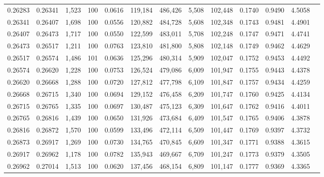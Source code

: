 \begin{tabular}{rrrrrrrrrrrrr}
0.26283 & 0.26341 & 1,523 & 100 &                                     0.0616 & 119,184 & 486,426 &   5,508 & 102,448 & 0.1740 & 0.9490 & 4.5058 \\
0.26341 & 0.26407 & 1,698 & 100 &                                     0.0556 & 120,882 & 484,728 &   5,608 & 102,348 & 0.1743 & 0.9481 & 4.4901 \\
0.26407 & 0.26473 & 1,717 & 100 &                                     0.0550 & 122,599 & 483,011 &   5,708 & 102,248 & 0.1747 & 0.9471 & 4.4741 \\
0.26473 & 0.26517 & 1,211 & 100 &                                     0.0763 & 123,810 & 481,800 &   5,808 & 102,148 & 0.1749 & 0.9462 & 4.4629 \\
0.26517 & 0.26574 & 1,486 & 101 &                                     0.0636 & 125,296 & 480,314 &   5,909 & 102,047 & 0.1752 & 0.9453 & 4.4492 \\
0.26574 & 0.26620 & 1,228 & 100 &                                     0.0753 & 126,524 & 479,086 &   6,009 & 101,947 & 0.1755 & 0.9443 & 4.4378 \\
0.26620 & 0.26668 & 1,288 & 100 &                                     0.0720 & 127,812 & 477,798 &   6,109 & 101,847 & 0.1757 & 0.9434 & 4.4259 \\
0.26668 & 0.26715 & 1,340 & 100 &                                     0.0694 & 129,152 & 476,458 &   6,209 & 101,747 & 0.1760 & 0.9425 & 4.4134 \\
0.26715 & 0.26765 & 1,335 & 100 &                                     0.0697 & 130,487 & 475,123 &   6,309 & 101,647 & 0.1762 & 0.9416 & 4.4011 \\
0.26765 & 0.26816 & 1,439 & 100 &                                     0.0650 & 131,926 & 473,684 &   6,409 & 101,547 & 0.1765 & 0.9406 & 4.3878 \\
0.26816 & 0.26872 & 1,570 & 100 &                                     0.0599 & 133,496 & 472,114 &   6,509 & 101,447 & 0.1769 & 0.9397 & 4.3732 \\
0.26873 & 0.26917 & 1,269 & 100 &                                     0.0730 & 134,765 & 470,845 &   6,609 & 101,347 & 0.1771 & 0.9388 & 4.3615 \\
0.26917 & 0.26962 & 1,178 & 100 &                                     0.0782 & 135,943 & 469,667 &   6,709 & 101,247 & 0.1773 & 0.9379 & 4.3505 \\
0.26962 & 0.27014 & 1,513 & 100 &                                     0.0620 & 137,456 & 468,154 &   6,809 & 101,147 & 0.1777 & 0.9369 & 4.3365 \\

\end{tabular}

